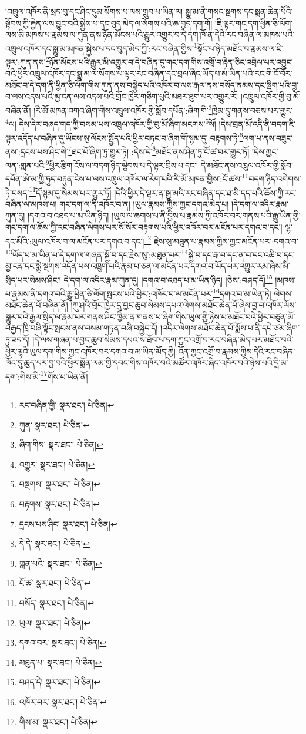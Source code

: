།འཁྲུལ་འཁོར་ནི་སྲད་བུ་དང་ཤིང་དུམ་སོགས་པ་ལས་གྲུབ་པ་ཡིན་ལ། སྒྱུ་མ་ནི་གསང་སྔགས་དང་སྨན་ཆེན་པོའི་སྟོབས་ཀྱི་རྐྱེན་ལས་བྱུང་བའི་སྐྱེས་པ་དང་བུད་མེད་ལ་སོགས་པའི་ཆ་བྱད་དག་གོ། །ཇི་ལྟར་གང་དག་ཕྱིན་ཅི་ལོག་ལས་མི་མཁས་པ་རྣམས་ལ་ཀུན་ནས་ཉོན་མོངས་པའི་རྒྱུར་འགྱུར་བ་དེ་དག་ཁོ་ན་དེའི་རང་བཞིན་ལ་མཁས་པའི་འཁྲུལ་འཁོར་དང་སྒྱུ་མ་མཁན་སྐྱེས་པ་དང་བུད་མེད་ཀྱི་:རང་བཞིན་གྱིས་\footnote{རང་བཞིན་གྱི་  སྣར་ཐང་།  པེ་ཅིན། }སྟོང་པ་ཉིད་མཐོང་བ་རྣམས་ལ་ཇི་ལྟར་:ཀུན་ནས་\footnote{ཀུན་  སྣར་ཐང་།  པེ་ཅིན། }ཉོན་མོངས་པའི་རྒྱུར་མི་འགྱུར་བ་དེ་བཞིན་དུ་གང་དག་གིས་འགྲོ་བ་རྟེན་ཅིང་འབྲེལ་པར་འབྱུང་བའི་ཕྱིར་འཁྲུལ་འཁོར་དང་སྒྱུ་མ་ལ་སོགས་པ་ལྟར་རང་བཞིན་དང་བྲལ་ཞིང་ཡོད་པ་མ་ཡིན་པའི་རང་གི་ངོ་བོར་མཐོང་བ་དེ་དག་ནི་ཕྱིན་ཅི་ལོག་གིས་ཀུན་ནས་བསྐྱེད་པའི་འཁོར་བ་ལས་རྒལ་ནས་བསོད་ནམས་དང་སྡིག་པའི་བྱ་བ་ལས་འདས་པའི་མྱ་ངན་ལས་འདས་པའི་གྲོང་ཁྱེར་གཅིག་པུའི་མཐར་ཐུག་པར་འགྱུར་རོ། །འཁྲུལ་འཁོར་གྱི་བུ་མོ་བཞིན་ནོ། །རི་མོ་མཁན་འགའ་ཞིག་གིས་འཁྲུལ་འཁོར་གྱི་སློབ་དཔོན་:ཞིག་གི་\footnote{ཞིག་གིས་  སྣར་ཐང་།  པེ་ཅིན། }ཁྱིམ་དུ་གནས་བཅས་པར་གྱུར་\footnote{འགྱུར་  སྣར་ཐང་།  པེ་ཅིན། }ལ། དེས་དེར་བཞད་གད་ཀྱི་བསམ་པས་འཁྲུལ་འཁོར་གྱི་བུ་མོ་ཞིག་མངགས་\footnote{བསྔགས་  སྣར་ཐང་།  པེ་ཅིན། }སོ། །དེས་བྲན་མོ་འདི་ནི་བདག་ཇི་ལྟར་འདོད་པ་བཞིན་དུ་ཡོངས་སུ་ལོངས་སྤྱོད་པའི་ཕྱིར་བཏང་བ་ཞིག་གོ་སྙམ་དུ་:བརྟགས་ཏེ་\footnote{བརྟགས་  སྣར་ཐང་།  པེ་ཅིན། }ལག་པ་ནས་བཟུང་ནས་:དྲངས་པས་ཤིང་གི་\footnote{དྲངས་པས་ཤིང་  སྣར་ཐང་།  པེ་ཅིན། }ཐང་པོ་ཞིག་ཏུ་གྱུར་ཏེ། :དེས་དེ་\footnote{དེ་དེ་  སྣར་ཐང་།  པེ་ཅིན། }མཐོང་ནས་ཤིན་ཏུ་ངོ་ཚ་བར་གྱུར་ཏོ། །དེས་ཀྱང་ལན་:གླན་པའི་\footnote{ཀླན་པའི་  སྣར་ཐང་།  པེ་ཅིན། }ཕྱིར་རྩིག་ངོས་ལ་བདག་ཉིད་ལྕེབས་པ་དེ་ལྟར་བྲིས་པ་དང་། དེ་མཐོང་ནས་འཁྲུལ་འཁོར་གྱི་སློབ་དཔོན་ཨེ་མ་ཀྱི་ཧུད་བརྟུན་ངེས་པ་ལས་འཁྲུལ་འཁོར་ལ་རེག་པའི་རི་མོ་མཁན་གྱིས་:ངོ་ཚས་\footnote{ངོ་ཚ་  སྣར་ཐང་།  པེ་ཅིན། }བདག་ཉིད་འགེགས་ཏེ་བསད་\footnote{བསོད་  སྣར་ཐང་།  པེ་ཅིན། }དོ་སྙམ་དུ་སེམས་པར་གྱུར་ཏོ། །དེའི་ཕྱིར་དེ་ལྟར་ན་སྒྱུ་མའི་རང་བཞིན་དང་ཐ་མི་དད་པའི་ཆོས་ཀྱི་རང་བཞིན་ལ་མཁས་པ། གང་དག་ལ་ནི་འཁོར་བ་ན། །ཡུལ་རྣམས་ཀྱིས་ཀྱང་དགའ་མེད་པ། །དེ་དག་ལ་འདིར་རྣམ་ཀུན་དུ། །དགའ་བ་འཐད་པ་མ་ཡིན་ཉིད། །ཡུལ་ལ་ཆགས་པ་ནི་བྱིས་པ་རྣམས་ཀྱི་འཁོར་བར་གནས་པའི་རྒྱུ་ཡིན་གྱི་གང་དག་ལ་ཆོས་ཀྱི་རང་བཞིན་ལེགས་པར་སོ་སོར་བརྟགས་པའི་ཕྱིར་འཁོར་བར་མངོན་པར་དགའ་བ་དང་། ལྷ་དང་མིའི་:ཡུལ་འཁོར་བ་ལ་མངོན་པར་དགའ་བ་དང་།\footnote{ཡུལ།  སྣར་ཐང་།  པེ་ཅིན། } རྗེས་སུ་མཐུན་པ་རྣམས་ཀྱིས་ཀྱང་མངོན་པར་:དགའ་བ་\footnote{དགའ་བར་  སྣར་ཐང་།  པེ་ཅིན། }ཡོད་པ་མ་ཡིན་པ་དེ་དག་ལ་གཞན་སྐྱོ་བ་དང་རྗེས་སུ་:མཐུན་པར་\footnote{མཐུན་པ་  སྣར་ཐང་།  པེ་ཅིན། }སྐྱེ་བ་དང་རྒ་བ་དང་ན་བ་དང་འཆི་བ་དང་མྱ་ངན་དང་སྨྲེ་སྔགས་འདོན་པས་འཁྲུག་པའི་རྣམ་པ་ཅན་ལ་མངོན་པར་དགའ་བ་ཡོད་པར་འགྱུར་རམ་ཞེས་མི་སྲིད་པར་སེམས་ཤིང་། དེ་དག་ལ་འདིར་རྣམ་ཀུན་དུ། །དགའ་བ་འཐད་པ་མ་ཡིན་ཉིད། །ཅེས་:བཤད་དོ།\footnote{བཤད་དེ།  སྣར་ཐང་།  པེ་ཅིན། } །མཁས་པ་རྣམས་ནི་དགའ་བའི་རྒྱུ་ཕྱིན་ཅི་ལོག་སྤངས་པའི་ཕྱིར་:འཁོར་བ་ལ་མངོན་པར་\footnote{འཁོར་བར་  སྣར་ཐང་།  པེ་ཅིན། }དགའ་བ་མ་ཡིན་ཏེ། ལེགས་མཐོང་ཆེན་པོ་བཞིན་ནོ། །ཀུ་ཤའི་གྲོང་ཁྱེར་དུ་བྱང་ཆུབ་སེམས་དཔའ་ལེགས་མཐོང་ཆེན་པོ་ཞེས་བྱ་བ་འཁོར་ལོས་སྒྱུར་བའི་རྒྱལ་སྲིད་ལ་རྣམ་པར་གནས་ཤིང་ཁྱིམ་ན་གནས་པ་ཞིག་གིས་ཡུལ་གྱི་ཉེས་པ་མཐོང་བའི་ཕྱིར་བཙུན་མོ་བརྒྱད་ཁྲི་བཞི་སྟོང་སྤངས་ནས་བསམ་གཏན་བཞི་བསྐྱེད་དོ། །འདིར་ལེགས་མཐོང་ཆེན་པོ་སྨོས་པ་ནི་དཔེ་ཙམ་ཞིག་ཏུ་ཟད་དོ། །དེ་ལས་གཞན་པ་བྱང་ཆུབ་སེམས་དཔའ་ས་ཐོབ་པ་དག་ཀྱང་འགྲོ་བ་རང་བཞིན་མེད་པར་མཐོང་བའི་ཕྱིར་ལྷའི་ཡུལ་དག་གིས་ཀྱང་འཁོར་བར་དགའ་བ་མ་ཡིན་མོད་ཀྱི། འོན་ཀྱང་འགྲོ་བ་རྣམས་ཀྱིས་དེའི་རང་བཞིན་ཁོང་དུ་ཆུད་པར་བྱ་བའི་ཕྱིར་སྨོན་ལམ་གྱི་དབང་གིས་འཁོར་བའི་མཚོར་འཁོར་ཞིང་འཁོར་བའི་ཉེས་པའི་དྲི་མ་དག་:གིས་མི་\footnote{གིས་མ་  སྣར་ཐང་།  པེ་ཅིན། }གོས་པ་ཡིན་ནོ། 